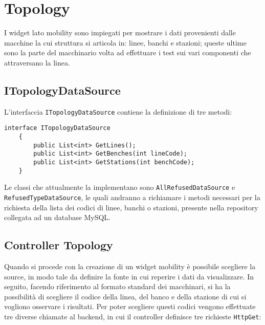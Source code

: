 \section{Topology}
\label{chap:topology}
I widget lato mobility sono impiegati per mostrare i dati provenienti dalle macchine la cui struttura si articola in: linee, banchi e stazioni; queste ultime sono la parte del macchinario volta ad effettuare i test sui vari componenti che attraversano la linea.

\subsection{ITopologyDataSource}
L'interfaccia \verb|ITopologyDataSource| contiene la definizione di tre metodi:

\begin{lstlisting}[caption={TopologyController.cs}, style=javaScriptCode]
    interface ITopologyDataSource
    {
        public List<int> GetLines();
        public List<int> GetBenches(int lineCode);
        public List<int> GetStations(int benchCode);
    }
\end{lstlisting}
Le classi che attualmente la implementano sono \verb|AllRefusedDataSource| e\\ \verb|RefusedTypeDataSource|, le quali andranno a richiamare i metodi necessari per la richiesta della lista dei codici di linee, banchi o stazioni, presente nella repository collegata ad un database MySQL.

\subsection{Controller Topology}
Quando si procede con la creazione di un widget mobility è possibile scegliere la source, in modo tale da definire la fonte in cui reperire i dati da visualizzare. In seguito,  facendo riferimento al formato standard dei macchinari, si ha la possibilità di scegliere il codice della linea, del banco e della stazione di cui si vogliono osservare i risultati.
Per poter scegliere questi codici vengono effettuate tre diverse chiamate al backend, in cui il controller definisce tre richieste \verb|HttpGet|:

